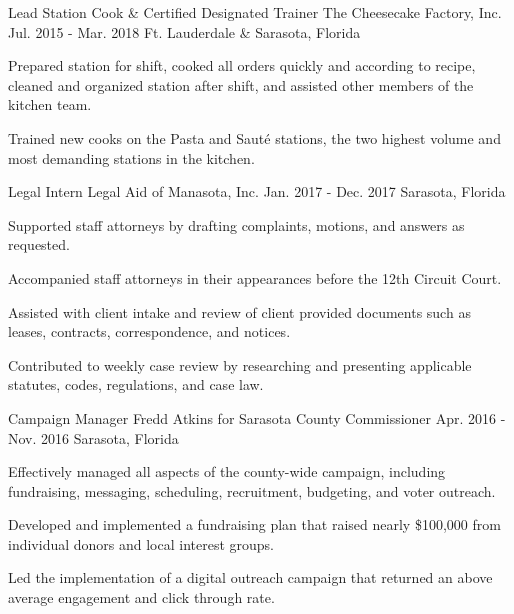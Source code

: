 \begin{cventries}
  \cventry
    {Lead Station Cook \& Certified Designated Trainer} %
    {The Cheesecake Factory, Inc.} %
    {Jul. 2015 - Mar. 2018} %
    {Ft. Lauderdale \& Sarasota, Florida} %
    {
      \begin{cvitems} %
        \item {Prepared station for shift, cooked all orders quickly and according to recipe, cleaned and organized station after shift, and assisted other members of the kitchen team.}
        \item {Trained new cooks on the Pasta and Sauté stations, the two highest volume and most demanding stations in the kitchen.}
      \end{cvitems}
    }

  \cventry
    {Legal Intern} %
    {Legal Aid of Manasota, Inc.} %
    {Jan. 2017 - Dec. 2017} %
    {Sarasota, Florida} %
    {
      \begin{cvitems} %
        \item {Supported staff attorneys by drafting complaints, motions, and answers as requested.}
        \item {Accompanied staff attorneys in their appearances before the 12th Circuit Court.}
        \item {Assisted with client intake and review of client provided documents such as leases, contracts, correspondence, and notices.}
        \item {Contributed to weekly case review by researching and presenting applicable statutes, codes, regulations, and case law.}
      \end{cvitems}
    }

  \cventry
    {Campaign Manager} %
    {Fredd Atkins for Sarasota County Commissioner} %
    {Apr. 2016 - Nov. 2016} %
    {Sarasota, Florida} %
    {
      \begin{cvitems} %
        \item {Effectively managed all aspects of the county-wide campaign, including fundraising, messaging, scheduling, recruitment, budgeting, and voter outreach.}
        \item {Developed and implemented a fundraising plan that raised nearly \$100,000 from individual donors and local interest groups.}
        \item {Led the implementation of a digital outreach campaign that returned an above average engagement and click through rate.}
      \end{cvitems}
    }


\end{cventries}
